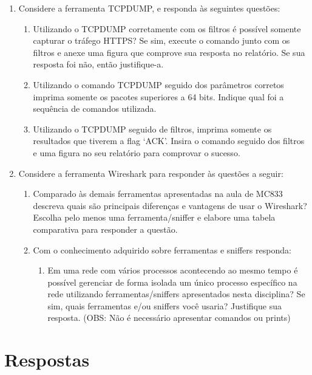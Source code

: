 \documentclass[12pt,a4paper]{report}
\begin{document}
\begin{enumerate}
    \item Considere a ferramenta TCPDUMP, e responda às seguintes questões:
    \begin{enumerate}
        \item Utilizando o TCPDUMP corretamente com os filtros é possível somente capturar o tráfego HTTPS? Se sim, execute o comando junto com os filtros e anexe uma figura que comprove sua resposta no relatório. Se sua resposta foi não, então justifique-a.
        \item Utilizando o comando TCPDUMP seguido dos parâmetros corretos imprima somente os pacotes superiores a 64 bits. Indique qual foi a sequência de comandos utilizada. 
        \item Utilizando o TCPDUMP seguido de filtros, imprima somente os resultados que tiverem a flag ‘ACK’. Insira o comando seguido dos filtros e uma figura no seu relatório para comprovar o sucesso.
    \end{enumerate}
    
    \item Considere a ferramenta Wireshark para responder às questões a seguir:
    \begin{enumerate}
        \item Comparado às demais ferramentas apresentadas na aula de MC833 descreva quais são principais diferenças e vantagens de usar o Wireshark? Escolha pelo menos uma ferramenta/sniffer e elabore uma tabela comparativa para responder a questão. 
        \item Com o conhecimento adquirido sobre ferramentas e sniffers responda:
        \begin{enumerate}
            \item Em uma rede com vários processos acontecendo ao mesmo tempo é possível gerenciar de forma isolada um único processo específico na rede utilizando ferramentas/sniffers apresentados nesta disciplina? Se sim, quais ferramentas  e/ou sniffers você usaria? Justifique sua resposta. (OBS: Não é necessário apresentar comandos ou prints)
        \end{enumerate}
    \end{enumerate}
\end{enumerate}

\section{Respostas}
\end{document}
